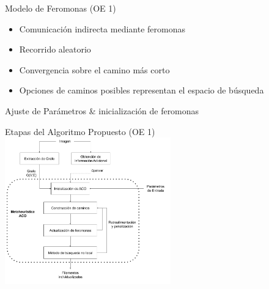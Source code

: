 \begin{frame}{Modelo de Feromonas (OE 1)}
\small
\begin{itemize}
    \item Comunicaci\'on indirecta mediante feromonas
    \item Recorrido aleatorio
    \item Convergencia sobre el camino m\'as corto
    \item Opciones de caminos posibles representan el espacio de b\'usqueda
\end{itemize}
    \begin{algorithm}[H]
    \SetAlgoLined
     Ajuste de Par\'ametros \& inicializaci\'on de feromonas\;
     \caption{Algoritmo metaheur\'istica ACO}\label{ACO-Algo}
    \end{algorithm}
\end{frame}


\begin{frame}{Etapas del Algoritmo Propuesto (OE 1)}
\centering  
\includegraphics[height=2.5in]{Pictures/ACOdiagram.png}
\end{frame}


